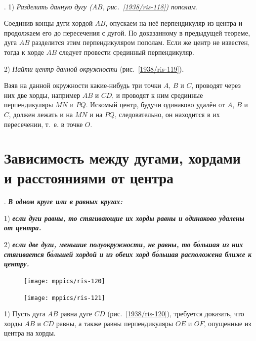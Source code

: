 \documentclass[oneside]{book}
\begin{document}
\paragraph{}\label{1938/108}
\mbox{.}
1) \emph{Разделить данную дугу \emph{($AB$, рис.~\ref{1938/ris-118})} пополам.}

Соединив концы дуги хордой $AB$, опускаем на неё перпендикуляр из центра и продолжаем его до пересечения с дугой.
По доказанному в предыдущей теореме, дуга $AB$ разделится этим перпендикуляром пополам.
Если же центр не известен, тогда к хорде $AB$ следует провести срединный перпендикуляр. 

2) \emph{Найти центр данной окружности} (рис.~\ref{1938/ris-119}).

Взяв на данной окружности какие-нибудь три точки $A$, $B$ и $C$, проводят через них две хорды, например $AB$ и $CD$, и проводят к ним срединные перпендикуляры $MN$ и $PQ$. 
Искомый центр, будучи одинаково удалён от $A$, $B$ и $C$, должен лежать и на $MN$ и на $PQ$, следовательно, он находится в их пересечении, т.~е. в точке $O$.

\section{Зависимость между дугами, хордами и расстояниями от центра}

\paragraph{}\label{1938/109}
.
\textbf{\emph{В одном круге или в равных кругах:}}

1) \textbf{\emph{если дуги равны, то стягивающие их хорды равны и одинаково удалены от центра.}}

2) \textbf{\emph{если две дуги, меньшие полуокружности, не равны, то б\'{о}льшая из них стягивается б\'{о}льшей хордой и из обеих хорд б\'{о}льшая расположена ближе к центру.}}

\begin{figure}
\centering
\texttt{[image: mppics/ris-120]}
\caption{}\label{1938/ris-120}
\bigskip
\texttt{[image: mppics/ris-121]}
\caption{}\label{1938/ris-121}
\end{figure}

1) Пусть дуга $AB$ равна дуге $CD$ (рис.~\ref{1938/ris-120}), требуется доказать, что хорды $AB$ и $CD$ равны, а также равны перпендикуляры $OE$ и $OF$, опущенные из центра на хорды.
\end{document}

